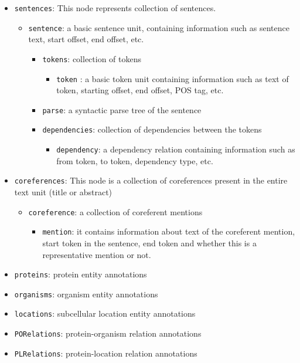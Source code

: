 \begin{enumerate}
\begin{itemize}
\item \texttt{sentences}: This node represents collection of sentences.
  \begin{itemize}
  \item \texttt{sentence}: a basic sentence unit, containing information such as sentence text, start offset, end offset, etc.
    \begin{itemize}
	\item \texttt{tokens}: collection of tokens
	  \begin{itemize}	  
	  \item \texttt{token}	: a basic token unit containing information such as text of token, starting offset, end offset, POS tag, etc.		
	  \end{itemize}
	\item \texttt{parse}: a syntactic parse tree of the sentence
	\item \texttt{dependencies}: collection of dependencies between the tokens	  
	  \begin{itemize}
	  \item \texttt{dependency}: a dependency relation containing information such as from token, to token, dependency type, etc.
	  \end{itemize}	  
	\end{itemize}	
  \end{itemize}
  \item \texttt{coreferences}:
    This node is a collection of coreferences present in the entire text unit (title or abstract)
    \begin{itemize}
    \item \texttt{coreference}: a collection of coreferent mentions
    \begin{itemize}
      \item \texttt{mention}: it contains information about text of the coreferent mention, start token in the sentence, end token and whether this is a representative mention or not.
    \end{itemize}
    \end{itemize}

\item \texttt{proteins}: protein entity annotations
\item \texttt{organisms}: organism entity annotations
\item \texttt{locations}: subcellular location entity annotations
\item \texttt{PORelations}: protein-organism relation annotations
\item \texttt{PLRelations}: protein-location relation annotations
\end{itemize}


\end{enumerate}
